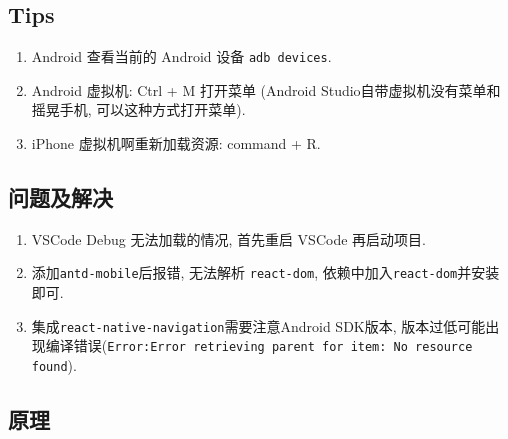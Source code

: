 \subsection{Tips}\label{tips}

\begin{enumerate}
\def\labelenumi{\arabic{enumi}.}
\tightlist
\item
  Android 查看当前的 Android 设备 \lstinline!adb devices!.
\item
  Android 虚拟机: Ctrl + M 打开菜单 (Android
  Studio自带虚拟机没有菜单和摇晃手机, 可以这种方式打开菜单).
\item
  iPhone 虚拟机啊重新加载资源: command + R.
\end{enumerate}

\subsection{问题及解决}\label{ux95eeux9898ux53caux89e3ux51b3}

\begin{enumerate}
\def\labelenumi{\arabic{enumi}.}
\tightlist
\item
  VSCode Debug 无法加载的情况, 首先重启 VSCode 再启动项目.
\item
  添加\lstinline!antd-mobile!后报错, 无法解析 \lstinline!react-dom!,
  依赖中加入\lstinline!react-dom!并安装即可.
\item
  集成\lstinline!react-native-navigation!需要注意Android SDK版本,
  版本过低可能出现编译错误(\lstinline!Error:Error retrieving parent for item: No resource found!).
\end{enumerate}

\subsection{原理}\label{ux539fux7406}

